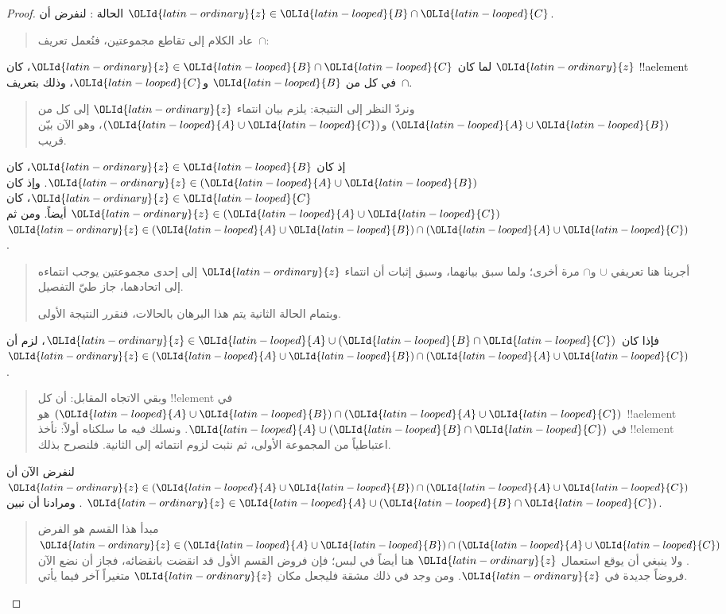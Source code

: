 \documentclass[../../../include/open-logic-section]{subfiles}
\begin{document}
\begin{proof}
الحالة : لنفرض أن ${\OLId{latin-ordinary}{z}} \in {\OLId{latin-looped}{B}} \cap {\OLId{latin-looped}{C}}$.
\begin{quote}
عاد الكلام إلى تقاطع مجموعتين، فنُعمل تعريف~$\cap$:
\end{quote}
لما كان ${\OLId{latin-ordinary}{z}} \in {\OLId{latin-looped}{B}} \cap {\OLId{latin-looped}{C}}$، كان ${\OLId{latin-ordinary}{z}}$ !!a{element} في كل من ${\OLId{latin-looped}{B}}$ و${\OLId{latin-looped}{C}}$،
وذلك بتعريف~$\cap$.
\begin{quote}
ونردّ النظر إلى النتيجة: يلزم بيان انتماء ${\OLId{latin-ordinary}{z}}$ إلى كل من
$({\OLId{latin-looped}{A}} \cup {\OLId{latin-looped}{B}})$ و$({\OLId{latin-looped}{A}} \cup {\OLId{latin-looped}{C}})$، وهو الآن بيّن قريب.
\end{quote}
إذ كان ${\OLId{latin-ordinary}{z}} \in {\OLId{latin-looped}{B}}$، كان ${\OLId{latin-ordinary}{z}} \in ({\OLId{latin-looped}{A}} \cup {\OLId{latin-looped}{B}})$. وإذ كان ${\OLId{latin-ordinary}{z}} \in {\OLId{latin-looped}{C}}$، كان
${\OLId{latin-ordinary}{z}} \in ({\OLId{latin-looped}{A}} \cup {\OLId{latin-looped}{C}})$ أيضاً. ومن ثم
${\OLId{latin-ordinary}{z}} \in ({\OLId{latin-looped}{A}} \cup {\OLId{latin-looped}{B}}) \cap ({\OLId{latin-looped}{A}} \cup {\OLId{latin-looped}{C}})$.
\begin{quote}
أجرينا هنا تعريفي $\cup$ و$\cap$ مرة أخرى؛ ولما سبق بيانهما، وسبق
إثبات أن انتماء ${\OLId{latin-ordinary}{z}}$ إلى إحدى مجموعتين يوجب انتماءه إلى اتحادهما، جاز
طيّ التفصيل.

وبتمام الحالة الثانية يتم هذا البرهان بالحالات، فنقرر النتيجة الأولى.
\end{quote}
فإذا كان ${\OLId{latin-ordinary}{z}} \in {\OLId{latin-looped}{A}} \cup ({\OLId{latin-looped}{B}} \cap {\OLId{latin-looped}{C}})$، لزم أن
${\OLId{latin-ordinary}{z}} \in ({\OLId{latin-looped}{A}} \cup {\OLId{latin-looped}{B}}) \cap ({\OLId{latin-looped}{A}} \cup {\OLId{latin-looped}{C}})$.
\begin{quote}
وبقي الاتجاه المقابل: أن كل !!{element} في
$({\OLId{latin-looped}{A}} \cup {\OLId{latin-looped}{B}}) \cap ({\OLId{latin-looped}{A}} \cup {\OLId{latin-looped}{C}})$ هو !!a{element} في
${\OLId{latin-looped}{A}} \cup ({\OLId{latin-looped}{B}} \cap {\OLId{latin-looped}{C}})$. ونسلك فيه ما سلكناه أولاً: نأخذ !!{element}
اعتباطياً من المجموعة الأولى، ثم نثبت لزوم انتمائه إلى الثانية.
فلنصرح بذلك.
\end{quote}
لنفرض الآن أن ${\OLId{latin-ordinary}{z}} \in ({\OLId{latin-looped}{A}} \cup {\OLId{latin-looped}{B}}) \cap ({\OLId{latin-looped}{A}} \cup {\OLId{latin-looped}{C}})$. ومرادنا أن نبين
${\OLId{latin-ordinary}{z}} \in {\OLId{latin-looped}{A}} \cup ({\OLId{latin-looped}{B}} \cap {\OLId{latin-looped}{C}})$.
\begin{quote}
مبدأ هذا القسم هو الفرض ${\OLId{latin-ordinary}{z}} \in ({\OLId{latin-looped}{A}} \cup {\OLId{latin-looped}{B}}) \cap ({\OLId{latin-looped}{A}} \cup {\OLId{latin-looped}{C}})$. ولا
ينبغي أن يوقع استعمال ${\OLId{latin-ordinary}{z}}$ هنا أيضاً في لبس؛ فإن فروض القسم الأول قد
انقضت بانقضائه، فجاز أن نضع الآن فروضاً جديدة في ${\OLId{latin-ordinary}{z}}$. ومن وجد في ذلك
مشقة فليجعل مكان ${\OLId{latin-ordinary}{z}}$ متغيراً آخر فيما يأتي.


\end{quote}
\end{proof}
\end{document}
